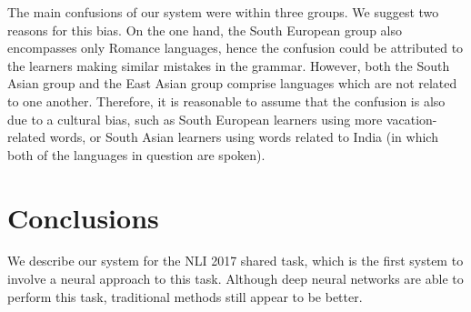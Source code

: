 \documentclass[11pt,letterpaper]{article}
\begin{document}
The main confusions of our system were within three groups.
We suggest two reasons for this bias.
On the one hand, the South European group also encompasses only Romance languages, hence the confusion could be attributed to the learners making similar mistakes in the grammar.
However, both the South Asian group and the East Asian group comprise languages which are not related to one another.
Therefore, it is reasonable to assume that the confusion is also due to a cultural bias, such as South European learners using more vacation-related words, or South Asian learners using words related to India (in which both of the languages in question are spoken).

\section{Conclusions}
We describe our system for the NLI 2017 shared task, which is the first system to involve a neural approach to this task.
Although deep neural networks are able to perform this task, traditional methods still appear to be better.




\end{document}
